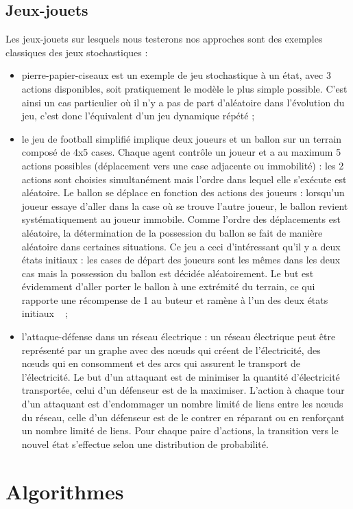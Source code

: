 \documentclass{article}
\begin{document}
\subsection{Jeux-jouets}
Les jeux-jouets sur lesquels nous testerons nos approches sont des exemples classiques des jeux stochastiques : 
\begin{itemize}
\item pierre-papier-ciseaux est un exemple de jeu stochastique à un état, avec 3 actions disponibles, soit pratiquement le modèle le plus simple possible. C’est ainsi un cas particulier où il n’y a pas de part d’aléatoire dans l’évolution du jeu, c’est donc l’équivalent d’un jeu dynamique répété ;
\item le jeu de football simplifié implique deux joueurs et un ballon sur un terrain composé de 4x5 cases. Chaque agent contrôle un joueur et a au maximum 5 actions possibles (déplacement vers une case adjacente ou immobilité) : les 2 actions sont choisies simultanément mais l’ordre dans lequel elle s’exécute est aléatoire. Le ballon se déplace en fonction des actions des joueurs : lorsqu'un joueur essaye d'aller dans la case où se trouve l'autre joueur, le ballon revient systématiquement au joueur immobile. Comme l'ordre des déplacements est aléatoire, la détermination de la possession du ballon se fait de manière aléatoire dans certaines situations. Ce jeu a ceci d'intéressant qu'il y a deux états initiaux : les cases de départ des joueurs sont les mêmes dans les deux cas mais la possession du ballon est décidée aléatoirement. Le but est évidemment d’aller porter le ballon à une extrémité du terrain, ce qui rapporte une récompense de 1 au buteur et ramène à l'un des deux états initiaux ~\cite{littman} ;
\item l’attaque-défense dans un réseau électrique : un réseau électrique peut être représenté par un graphe avec des nœuds qui créent de l’électricité, des nœuds qui en consomment et des arcs qui assurent le transport de l’électricité. Le but d’un attaquant est de minimiser la quantité d’électricité transportée, celui d’un défenseur est de la maximiser. L’action à chaque tour d’un attaquant est d’endommager un nombre limité de liens entre les nœuds du réseau, celle d’un défenseur est de le contrer en réparant ou en renforçant un nombre limité de liens. Pour chaque paire d’actions, la transition vers le nouvel état s’effectue selon une distribution de probabilité. ~\cite{att-def}
\end{itemize}


\section{Algorithmes}
\end{document}
